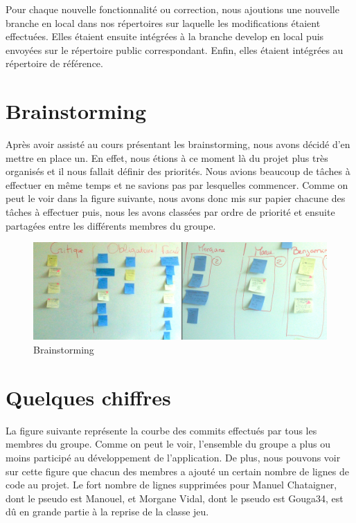 \documentclass{report}
\begin{document}
Pour chaque nouvelle fonctionnalité ou correction, nous ajoutions une nouvelle branche en local dans nos répertoires sur laquelle les modifications étaient effectuées. Elles étaient ensuite intégrées à la branche develop en local puis envoyées sur le répertoire public correspondant. Enfin, elles étaient intégrées au répertoire de référence.\par


\section{Brainstorming}
\hspace{0.5cm}Après avoir assisté au cours présentant les brainstorming, nous avons décidé d'en mettre en place un. En effet, nous étions à ce moment là du projet plus très organisés et il nous fallait définir des priorités. Nous avions beaucoup de tâches à effectuer en même temps et ne savions pas par lesquelles commencer. Comme on peut le voir dans la figure suivante, nous avons donc mis sur papier chacune des tâches à effectuer puis, nous les avons classées par ordre de priorité et ensuite partagées entre les différents membres du groupe. \par

\begin{figure}[H]
\begin{center}
\includegraphics[scale=0.1]{./brainstorming.jpg}
\caption{Brainstorming}
\end{center}
\end{figure}

\section{Quelques chiffres}
\hspace{0.5cm}La figure suivante représente la courbe des commits effectués par tous les membres du groupe. Comme on peut le voir, l'ensemble du groupe a plus ou moins participé au développement de l'application. De plus, nous pouvons voir sur cette figure que chacun des membres a ajouté un certain nombre de lignes de code au projet. Le fort nombre de lignes supprimées pour Manuel Chataigner, dont le pseudo est Manouel, et Morgane Vidal, dont le pseudo est Gouga34, est dû en grande partie à la reprise de la classe jeu.\par
\end{document}
